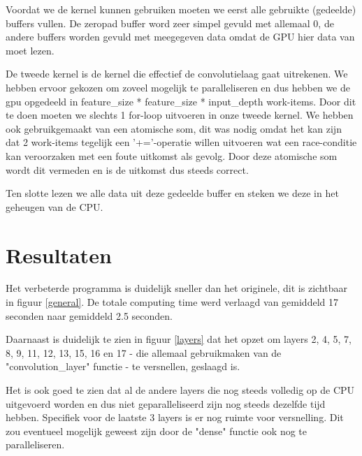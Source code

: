 \documentclass[a4paper, 12pt, one column]{article}
\begin{document}
\medskip
\noindent
Voordat we de kernel kunnen gebruiken moeten we eerst alle gebruikte (gedeelde) buffers vullen. De zeropad buffer 
word zeer simpel gevuld met allemaal 0, de andere buffers worden gevuld met meegegeven data omdat de GPU hier data
van moet lezen.

\medskip
\noindent
De tweede kernel is de kernel die effectief de convolutielaag gaat uitrekenen. We hebben ervoor gekozen om zoveel mogelijk te 
paralleliseren en dus hebben we de gpu opgedeeld in feature\_size * feature\_size * input\_depth work-items.
Door dit te doen moeten we slechts 1 for-loop uitvoeren in onze tweede kernel. 
We hebben ook gebruikgemaakt van een atomische som, dit was nodig omdat het kan zijn dat 2 work-items tegelijk een '+='-operatie
willen uitvoeren wat een race-conditie kan veroorzaken met een foute uitkomst als gevolg. Door deze atomische som wordt dit 
vermeden en is de uitkomst dus steeds correct.

\medskip
\noindent
Ten slotte lezen we alle data uit deze gedeelde buffer en steken we deze in het geheugen van de CPU.

\section{Resultaten}
Het verbeterde programma is duidelijk sneller dan het originele, dit is zichtbaar in figuur \ref{general}. De totale computing time
werd verlaagd van gemiddeld 17 seconden naar gemiddeld 2.5 seconden.

\medskip
\noindent
Daarnaast is duidelijk te zien in figuur \ref{layers} dat het opzet om layers 2, 4, 5, 7, 8, 9, 11, 12, 13, 15, 16 en 17 - die allemaal
gebruikmaken van de "convolution\_layer" functie - te versnellen, geslaagd is.

\medskip
\noindent
Het is ook goed te zien dat al de andere layers die nog steeds volledig op de CPU uitgevoerd worden en dus niet geparalleliseerd zijn
nog steeds dezelfde tijd hebben. Specifiek voor de laatste 3 layers is er nog ruimte voor versnelling. Dit zou eventueel mogelijk geweest
zijn door de "dense" functie ook nog te paralleliseren.
\end{document}
